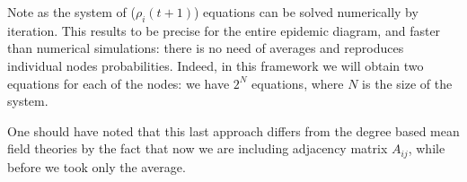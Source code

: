 \documentclass[../main/main.tex]{subfiles}
\begin{document}

Note as the system of (\( \rho _i (t+1) \)) equations can be solved numerically by iteration. This results to be precise for the entire epidemic diagram, and faster than numerical simulations: there is no need of averages and reproduces individual nodes probabilities. Indeed, in this framework we will obtain two equations for each of the nodes: we have \( 2^N \) equations, where \( N \) is the size of the system.

\begin{remark}
One should have noted that this last approach differs from the degree based mean field theories by the fact that now we are including adjacency matrix \( A_{ij} \), while before we took only the average.
\end{remark}
\end{document}
